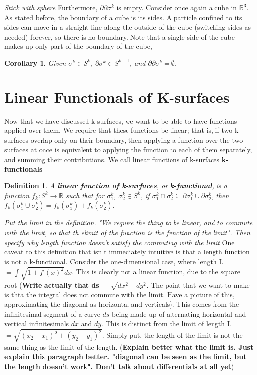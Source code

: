 \documentclass{book}
\newtheorem{defn}[equation]{Definition}
\newtheorem{coro}[equation]{Corollary}
\begin{document}
\textit{Stick with sphere}
Furthermore, $\partial\partial \sigma^k$ is empty. Consider once again a cube in $\mathbb{R}^3$. As stated before, the boundary of a cube is its sides. A particle confined to its sides can move in a straight line along the outside of the cube (switching sides as needed) forever, so there is no boundary. Note that a single side of the cube makes up only part of the boundary of the cube, 

\begin{coro}
	Given $\sigma^k \in S^k$, $\partial \sigma^k \in S^{k-1}$, and $\partial\partial \sigma^k = \emptyset$. 
\end{coro}


\section{Linear Functionals of K-surfaces}



Now that we have discussed k-surfaces, we want to be able to have functions applied over them. We require that these functions be linear; that is, if two k-surfaces overlap only on their boundary, then applying a function over the two surfaces at once is equivalent to applying the function to each of them separately, and summing their contributions. We call linear functions of k-surfaces \textbf{k-functionals}. 

\begin{defn}
	A \textbf{linear function of k-surfaces}, or \textbf{k-functional}, is a function $f_k : S^k \to \mathbb{R}$ such that for $\sigma^k_1$, $\sigma^k_2 \in S^k$, if $\sigma^k_1 \cap \sigma^k_2 \subseteq \partial \sigma^k_1 \cup \partial \sigma^k_2$, then $f_k(\sigma^k_1\cup \sigma^k_2) = f_k(\sigma^k_1) + f_k(\sigma^k_2)$. 
\end{defn}

\textit{Put the limit in the definition. "We require the thing to be linear, and to commute with the limit, so that th elimit of the function is the function of the limit". Then specify why length function doesn't satisfy the commuting with the limit}
One caveat to this definition that isn't immediately intuitive is that a length function is not a k-functional. Consider the one-dimensional case, where length L $= \int \sqrt{1+f'(x)^2} dx$. This is clearly not a linear function, due to the square root (\textbf{Write actually that ds = $\sqrt{dx^2 + dy^2}$}. The point that we want to make is thta the integral does not commute with the limit. Have a picture of this, approximating the diagonal as horizontal and verticals). This comes from the infinitesimal segment of a curve $ds$ being made up of alternating horizontal and vertical infinitesimals $dx$ and $dy$. This is distinct from the limit of length L $= \sqrt{(x_2 - x_1)^2 + (y_2 - y_1)^2}$. Simply put, the length of the limit is not the same thing as the limit of the length. (\textbf{Explain better what the limit is. Just explain this paragraph better. "diagonal can be seen as the limit, but the length doesn't work". Don't talk about differentials at all yet})
\end{document}
